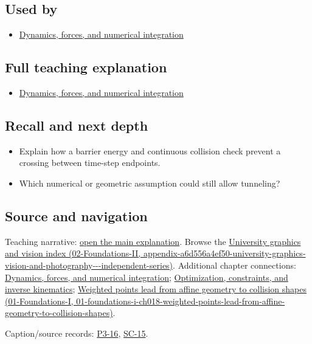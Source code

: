 \subsection{Used by}\label{appendix-a9ba01fa72a6-used-by}

\begin{itemize}
\tightlist
\item
  \hyperref[04-visual-computing-ii-ch029-dynamics-forces-and-numerical-integration]{Dynamics, forces, and numerical integration}
\end{itemize}

\subsection{Full teaching explanation}\label{appendix-a9ba01fa72a6-full-teaching-explanation}

\begin{itemize}
\tightlist
\item
  \hyperref[04-visual-computing-ii-ch029-dynamics-forces-and-numerical-integration]{Dynamics, forces, and numerical integration}
\end{itemize}

\subsection{Recall and next depth}\label{appendix-a9ba01fa72a6-recall-and-next-depth}

\begin{itemize}
\tightlist
\item
  Explain how a barrier energy and continuous collision check prevent a crossing between time-step endpoints.
\item
  Which numerical or geometric assumption could still allow tunneling?
\end{itemize}

\subsection{Source and navigation}\label{appendix-a9ba01fa72a6-source-and-navigation}

Teaching narrative: \hyperref[04-visual-computing-ii-ch029-dynamics-forces-and-numerical-integration]{open the main explanation}. Browse the \href{../02-Foundations-II/main.pdf\#nameddest=appendix-a6d556a4ef50-university-graphics-vision-and-photography---independent-series}{University graphics and vision index (02-Foundations-II, appendix-a6d556a4ef50-university-graphics-vision-and-photography-\/-\/-independent-series)}. Additional chapter connections: \hyperref[04-visual-computing-ii-ch029-dynamics-forces-and-numerical-integration]{Dynamics, forces, and numerical integration}; \hyperref[04-visual-computing-ii-ch029-optimization-constraints-and-inverse-kinematics]{Optimization, constraints, and inverse kinematics}; \href{../01-Foundations-I/main.pdf\#nameddest=01-foundations-i-ch018-weighted-points-lead-from-affine-geometry-to-collision-shapes}{Weighted points lead from affine geometry to collision shapes (01-Foundations-I, 01-foundations-i-ch018-weighted-points-lead-from-affine-geometry-to-collision-shapes)}.

Caption/source records: \hyperref[04-visual-computing-ii-ch036-p3-16---subdivision-surfaces-part-1]{P3-16}, \hyperref[04-visual-computing-ii-ch036-sc-15---stanford-cs231n-deep-learning-for-computer-vision-spring-2025-lecture-15-3d-vision]{SC-15}.

